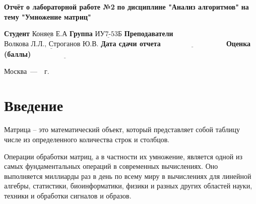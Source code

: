 \documentclass[12pt]{report}
\begin{document}
\begin{titlepage}
		
		\begin{center}
			\noindent\begin{minipage}{1.3\textwidth}\centering
				\Large\textbf{  Отчёт о лабораторной работе №2}\newline
				\textbf{по дисциплине "Анализ алгоритмов"}\newline
				\textbf{на тему "Умножение матриц"}\newline\newline
			\end{minipage}
		\end{center}
		
		\noindent\textbf{Студент} $\underline{\text{Коняев Е.А}}$\newline\newline
		\noindent\textbf{Группа} $\underline{\text{ИУ7-53Б}}$\newline\newline
		\noindent\textbf{Преподаватели} $\underline{\text{Волкова Л.Л., Строганов Ю.В.}}$\newline\newline
		\noindent\textbf{Дата сдачи отчета}$\underline{\text{~~~~~~~~~~~~~~~~~~~~~~~~~~~}}$\newline\newline
		\noindent\textbf{Оценка (баллы)} $\underline{\text{~~~~~~~~~~~~~~~~~~~~~~~~~~~}}$\newline\newline\newline
		
		\begin{center}
			\vfill
			Москва~---~\the\year~г.
		\end{center}
	\end{titlepage}
	
	\setcounter{page}{2}
	\tableofcontents
	
	\newpage
	\chapter*{Введение}
	

Матрица -- это математический объект, который представляет собой таблицу числе из определенного количества строк и столбцов.

Операции обработки матриц, а в частности их умножение, является одной из самых фундаментальных операций в современных вычислениях. Оно выполняется миллиарды раз в день по всему миру в вычислениях для линейной алгебры, статистики, биоинформатики, физики и разных других областей науки, техники и обработки сигналов и образов.
\end{document}
